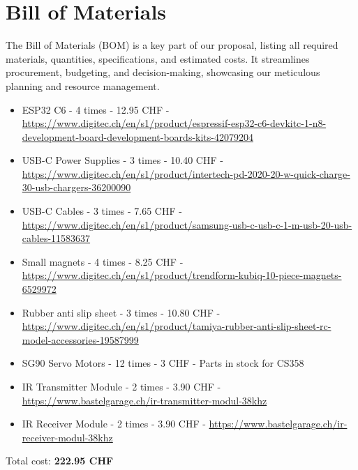 \section{Bill of Materials}

The Bill of Materials (BOM) is a key part of our proposal, listing all required materials, quantities, specifications, and estimated costs.
It streamlines procurement, budgeting, and decision-making, showcasing our meticulous planning and resource management.

\begin{itemize}
    \item ESP32 C6 - 4 times - 12.95 CHF - \url{https://www.digitec.ch/en/s1/product/espressif-esp32-c6-devkitc-1-n8-development-board-development-boards-kits-42079204}
    \item USB-C Power Supplies - 3 times - 10.40 CHF - \url{https://www.digitec.ch/en/s1/product/intertech-pd-2020-20-w-quick-charge-30-usb-chargers-36200090}
    \item USB-C Cables - 3 times - 7.65 CHF - \url{https://www.digitec.ch/en/s1/product/samsung-usb-c-usb-c-1-m-usb-20-usb-cables-11583637}
    \item Small magnets - 4 times - 8.25 CHF - \url{https://www.digitec.ch/en/s1/product/trendform-kubiq-10-piece-magnets-6529972}
    \item Rubber anti slip sheet - 3 times - 10.80 CHF - \url{https://www.digitec.ch/en/s1/product/tamiya-rubber-anti-slip-sheet-rc-model-accessories-19587999}
    \item SG90 Servo Motors - 12 times - 3 CHF - Parts in stock for CS358
    \item IR Transmitter Module - 2 times - 3.90 CHF - \url{https://www.bastelgarage.ch/ir-transmitter-modul-38khz}
    \item IR Receiver Module - 2 times - 3.90 CHF - \url{https://www.bastelgarage.ch/ir-receiver-modul-38khz}
\end{itemize}

Total cost: \textbf{222.95 CHF}
